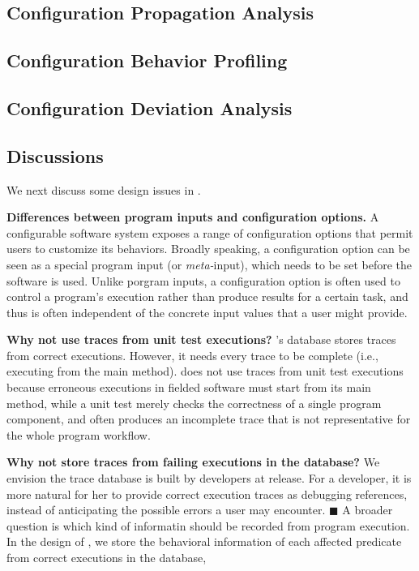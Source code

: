 \subsection{Configuration Propagation Analysis}
\label{sec:prop}


\subsection{Configuration Behavior Profiling}
\label{sec:profiling}



\subsection{Configuration Deviation Analysis}
\label{sec:analysis}



\subsection{Discussions}

We next discuss some design issues in \ourtool.

\vspace{1mm}
\noindent \textbf{Differences between program inputs and configuration options.}
A configurable software system exposes a range of configuration
options that permit users to
customize its behaviors. Broadly speaking,
a configuration option can be seen as a special program input
(or \textit{meta-}input), which needs to be set before the
software is used. Unlike porgram inputs, a configuration option is often
used to control a program's execution rather than
produce results for a certain task, and thus
is often independent of the concrete input values that a user might provide.


\vspace{1mm}
\noindent \textbf{Why not use traces from unit test executions?}
\ourtool's database stores traces from correct 
executions. However, it needs every trace to be complete
(i.e., executing from the main method).
\ourtool does not use traces from unit test executions
because erroneous executions
in fielded software must start from its main method, while
a unit test merely checks the correctness
of a single program component, and often produces
an incomplete trace that is not representative for
the whole program workflow. 



\vspace{1mm}
\noindent \textbf{Why not store traces from failing executions in the database?}
We envision the trace database is built by developers at release.
For a developer, it is more natural for her to provide correct execution
traces as debugging references, instead of
anticipating the possible errors a user may encounter.
$\blacksquare$
A broader question is which kind of informatin should be recorded
from program execution. 
In the design of \ourtool, we store the behavioral information
of each affected predicate from correct executions in the database,

